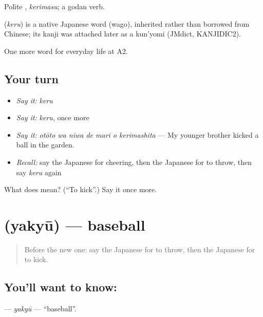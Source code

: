 Polite \textbf{}, \emph{kerimasu}; a godan verb.

\begin{cousinweb}
\textbf{} (\emph{keru}) is a native Japanese word (wago), inherited rather than borrowed from Chinese; its kanji was attached later as a kun'yomi (JMdict, KANJIDIC2).
\end{cousinweb}

\begin{grammarlens}[title={What you've built}]
One more word for everyday life at A2.
\end{grammarlens}

\subsection*{Your turn}
\begin{itemize}
\raggedright
  \item \emph{Say it:} \emph{keru}
  \item \emph{Say it:} \emph{keru}, once more
  \item \emph{Say it:} \emph{otōto wa niwa de mari o kerimashita} — My younger brother kicked a ball in the garden.
  \item \emph{Recall:} say the Japanese for cheering, then the Japanese for to throw, then say \emph{keru} again
\end{itemize}

\begin{tcolorbox}[breakable,colback=teal!4,colframe=teal!35!black,title={Before you move on}]
What does  mean? (\textquotedblleft{}To kick\textquotedblright{}.) Say it once more.
\end{tcolorbox}
\section[\texorpdfstring{\ja{やきゅう} (yakyū)}{やきゅう (yakyū)}]{ (yakyū) — baseball}

\label{lesson:JA-C235-yakyuu}



\begin{quote}
Before the new one: say the Japanese for to throw, then the Japanese for to kick.
\end{quote}

\subsection*{You'll want to know: }
\textbf{} — \emph{yakyū} — \textquotedblleft{}baseball\textquotedblright{}.

